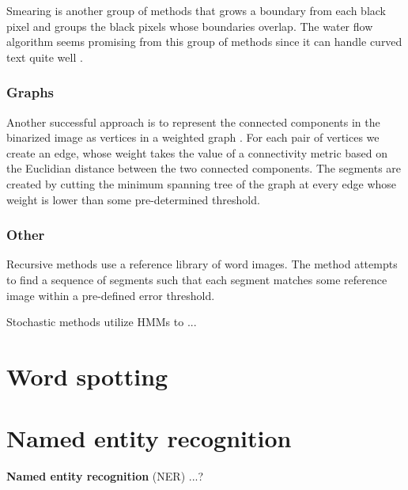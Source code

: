 Smearing is another group of methods that grows a boundary from each black pixel and groups the black pixels whose boundaries overlap. The water flow algorithm seems promising from this group of methods since it can handle curved text quite well \cite{Waterflow2011, Waterflow2015}.

\subsubsection{Graphs}

Another successful approach is to represent the connected components in the binarized image as vertices in a weighted graph \cite{GraphSegmentation}.
For each pair of vertices we create an edge, whose weight takes the value of a connectivity metric based on the Euclidian distance between the two connected components.
The segments are created by cutting the minimum spanning tree of the graph at every edge whose weight is lower than some pre-determined threshold.

\subsubsection{Other}

Recursive methods use a reference library of word images.
The method attempts to find a sequence of segments such that each segment matches some reference image within a pre-defined error threshold.

Stochastic methods utilize HMMs to ...



\section{Word spotting}


\section{Named entity recognition}

\textbf{Named entity recognition} (NER) ...?
